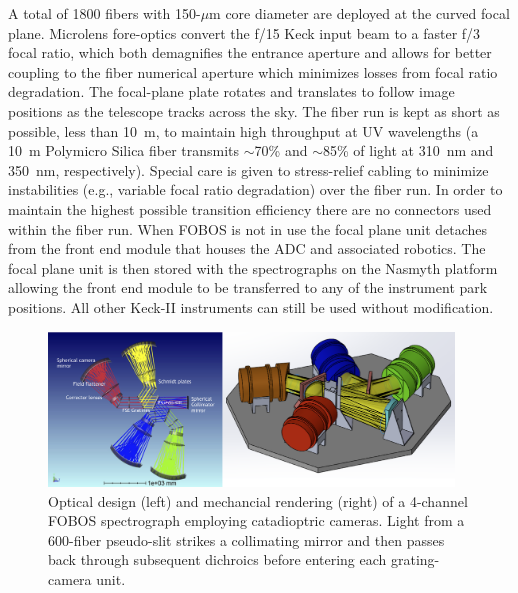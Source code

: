 A total of 1800 fibers with 150-$\mu$m core diameter are deployed at the
curved focal plane. Microlens fore-optics convert the f/15 Keck input
beam to a faster f/3 focal ratio, which both demagnifies the entrance
aperture and allows for better coupling to the fiber numerical aperture
which minimizes losses from focal ratio degradation.  The focal-plane
plate rotates and translates to follow image positions as the telescope
tracks across the sky. The fiber run is kept as short as possible, less
than 10~m, to maintain high throughput at UV wavelengths (a 10~m
Polymicro Silica fiber transmits $\sim$70\% and $\sim$85\% of light at
310~nm and 350~nm, respectively). Special care is given to stress-relief
cabling to minimize instabilities (e.g., variable focal ratio
degradation) over the fiber run. In order to maintain the highest
possible transition efficiency there are no connectors used within the
fiber run.  When FOBOS is not in use the focal plane unit detaches from
the front end module that houses the ADC and associated robotics.  The
focal plane unit is then stored with the spectrographs on the Nasmyth
platform allowing the front end module to be transferred to any of the
instrument park positions.  All other Keck-II instruments can still be
used without modification.

\begin{figure}[h!]
\vskip -0.1in
\includegraphics[width=0.96\textwidth]{figs/FOBOS_spec_optical-CAD.png}
\caption{\small Optical design (left) and mechancial rendering (right) of a 4-channel FOBOS spectrograph employing catadioptric cameras.
Light from a 600-fiber pseudo-slit strikes a collimating mirror and then
passes back through subsequent dichroics before entering each grating-camera unit.}
\label{fig:spectrograph}
\end{figure}

